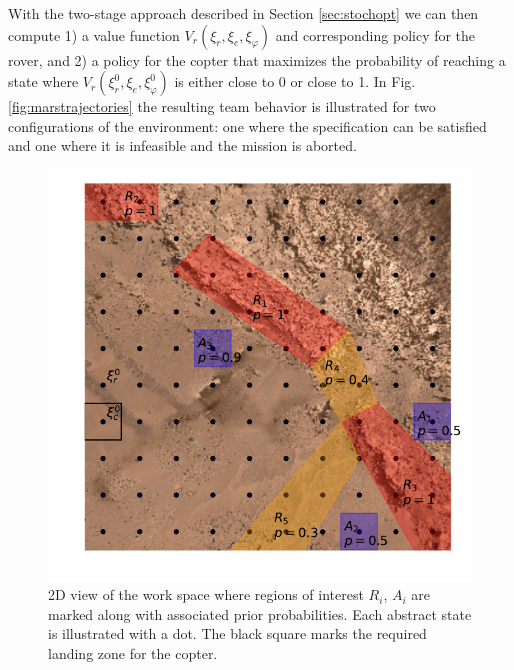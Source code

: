 \documentclass[conference]{IEEEtran}
\begin{document}
With the two-stage approach described in Section \ref{sec:stochopt} we can then compute 1) a value function $V_r(\xi_r, \xi_e, \xi_\varphi)$ and corresponding policy for the rover, and 2) a policy for the copter that maximizes the probability of reaching a state where $V_r(\xi_r^0, \xi_e, \xi_\varphi^0)$ is either close to 0 or close to 1. In Fig. \ref{fig:marstrajectories} the resulting team behavior is illustrated for two configurations of the environment: one where the specification can be satisfied and one where it is infeasible and the mission is aborted.

\begin{figure}
  \begin{center}
    \includegraphics[width=0.6\columnwidth]{2figs/arena-MARS.pdf}
  \end{center}
  \caption{2D view of the work space where regions of interest $R_i$, $A_i$ are marked along with associated prior probabilities. Each abstract state is illustrated with a dot. The black square marks the required landing zone for the copter.}
  \label{fig:workspacemars}
\end{figure}
\end{document}
